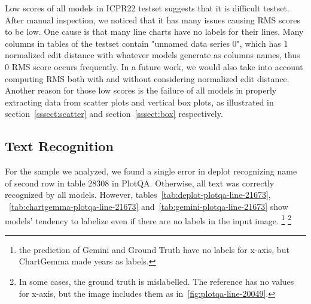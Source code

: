 \documentclass[
	letterpaper, %
]{jdf}
\begin{document}
Low scores of all models in ICPR22 testset suggests that it is difficult testset.
After manual inspection, we noticed that it has many issues causing RMS scores to be low.
One cause is that many line charts have no labels for their lines.
Many columns in tables of the testset contain "unnamed data series 0", which has 1 normalized edit distance with whatever models generate as columns names, thus 0 RMS score occurs frequently.
In a future work, we would also take into account computing RMS both with and without considering normalized edit distance.
Another reason for those low scores is the failure of all models in properly extracting data from scatter plots and vertical box plots, as illustrated in section~\ref{sssect:scatter} and section~\ref{sssect:box} respectively.

\subsection{Text Recognition}\label{ssect:qualitative-text-recognition}
For the sample we analyzed, we found a single error in deplot recognizing name of second row in table 28308 in PlotQA.
Otherwise, all text was correctly recognized by all models.
However, tables~\ref{tab:deplot-plotqa-line-21673}, ~\ref{tab:chartgemma-plotqa-line-21673} and~\ref{tab:gemini-plotqa-line-21673} show models' tendency to labelize even if there are no labels in the input image.
\footnote{the prediction of Gemini and Ground Truth have no labels for x-axis, but ChartGemma made years as labels.}
\footnote{In some cases, the ground truth is mislabelled. The reference has no values for x-axis, but the image includes them as in~\ref{fig:plotqa-line-20049}.}
\end{document}
